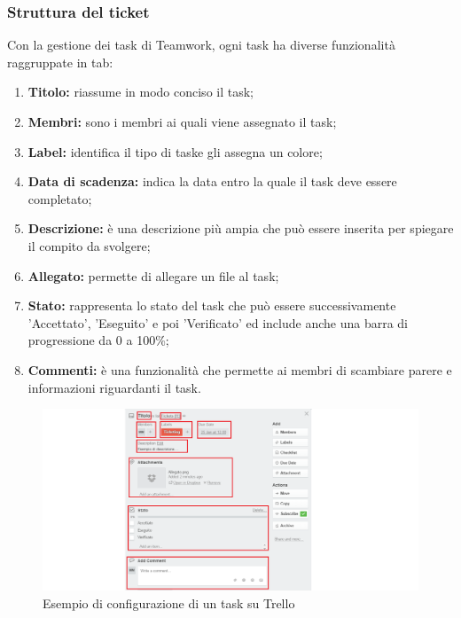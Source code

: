 \documentclass[a4paper,11pt]{article}
\begin{document}
		\subsubsection{Struttura del ticket}
		Con la gestione dei task di Teamwork, ogni task ha diverse funzionalità raggruppate in tab:
		
		
		\begin{enumerate}
		\item \textbf{Titolo:} riassume in modo conciso il task\addglos;
		\item \textbf{Membri:} sono i membri ai quali viene assegnato il task;
		\item \textbf{Label:} identifica il tipo di task\addglos e gli assegna un colore;
		\item \textbf{Data di scadenza:} indica la data entro la quale il task deve essere completato;
		\item \textbf{Descrizione:} è una descrizione più ampia che può essere inserita per spiegare il compito da svolgere;
		\item \textbf{Allegato:} permette di allegare un file al task;
		\item \textbf{Stato:} rappresenta lo stato del task che può essere successivamente 'Accettato', 'Eseguito' e poi 'Verificato' ed include anche una barra di progressione da 0 a 100\%; 
		\item \textbf{Commenti:} è una funzionalità che permette ai membri di scambiare parere e informazioni riguardanti il task.
		
	
		\end{enumerate}
		\begin{figure}[htbp]
		\centering
		\includegraphics[scale=0.50]{../images/tuto2.png}
		\caption{Esempio di configurazione di un task su Trello}			
			
		\end{figure}
			
\end{document}
